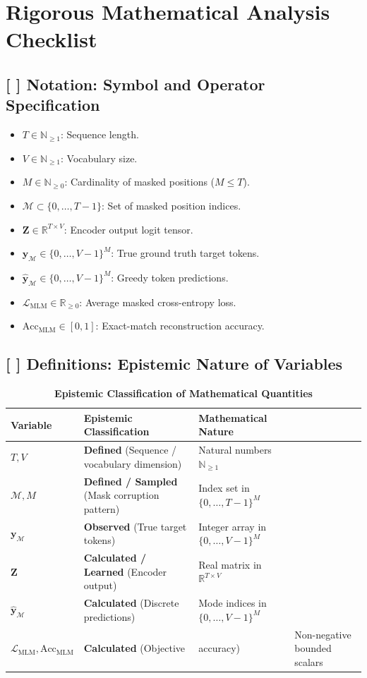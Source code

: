 \documentclass[11pt,a4paper]{article}
\theoremstyle{definition}
\begin{document}
\section{Rigorous Mathematical Analysis Checklist}

\subsection{[ ] Notation: Symbol and Operator Specification}
\begin{itemize}
    \item $T \in \mathbb{N}_{\ge 1}$: Sequence length.
    \item $V \in \mathbb{N}_{\ge 1}$: Vocabulary size.
    \item $M \in \mathbb{N}_{\ge 0}$: Cardinality of masked positions ($M \le T$).
    \item $\mathcal{M} \subset \{0, \dots, T-1\}$: Set of masked position indices.
    \item $\mathbf{Z} \in \mathbb{R}^{T \times V}$: Encoder output logit tensor.
    \item $\mathbf{y}_{\mathcal{M}} \in \{0, \dots, V-1\}^M$: True ground truth target tokens.
    \item $\hat{\mathbf{y}}_{\mathcal{M}} \in \{0, \dots, V-1\}^M$: Greedy token predictions.
    \item $\mathcal{L}_{\text{MLM}} \in \mathbb{R}_{\ge 0}$: Average masked cross-entropy loss.
    \item $\text{Acc}_{\text{MLM}} \in [0, 1]$: Exact-match reconstruction accuracy.
\end{itemize}

\subsection{[ ] Definitions: Epistemic Nature of Variables}
\begin{table}[h]
\centering
\caption{\textbf{Epistemic Classification of Mathematical Quantities}}
\begin{tabular}{lll}
\toprule
\textbf{Variable} & \textbf{Epistemic Classification} & \textbf{Mathematical Nature} \\
\midrule
$T, V$ & \textbf{Defined} (Sequence / vocabulary dimension) & Natural numbers $\mathbb{N}_{\ge 1}$ \\
$\mathcal{M}, M$ & \textbf{Defined / Sampled} (Mask corruption pattern) & Index set in $\{0, \dots, T-1\}^M$ \\
$\mathbf{y}_{\mathcal{M}}$ & \textbf{Observed} (True target tokens) & Integer array in $\{0, \dots, V-1\}^M$ \\
$\mathbf{Z}$ & \textbf{Calculated / Learned} (Encoder output) & Real matrix in $\mathbb{R}^{T \times V}$ \\
$\hat{\mathbf{y}}_{\mathcal{M}}$ & \textbf{Calculated} (Discrete predictions) & Mode indices in $\{0, \dots, V-1\}^M$ \\
$\mathcal{L}_{\text{MLM}}, \text{Acc}_{\text{MLM}}$ & \textbf{Calculated} (Objective & accuracy) & Non-negative bounded scalars \\
\bottomrule
\end{tabular}
\end{table}
\end{document}
